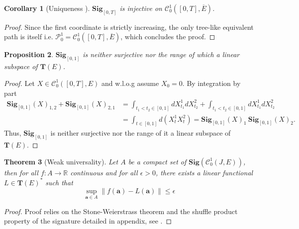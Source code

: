 \documentclass[12pt]{report}
\newtheorem{theorem}{Theorem}[chapter]
\newtheorem{corollary}[theorem]{Corollary}
\newtheorem{proposition}[theorem]{Proposition}
\theoremstyle{definition}
\theoremstyle{remark}
\newcommand{\R}{\mathbb{R}}
\begin{document}
\begin{corollary}[Uniqueness \cite{boedihardjo2016signature}] 
  $\mathbf{Sig}_{[0,T]}$ is injective on $\mathcal{C}^{1}_{0}([0,T],\overline{E})$.
\end{corollary}
\begin{proof}
  Since the first coordinate is strictly increasing, the only tree-like equivalent path is itself i.e. $\mathcal{P}^{1}_{0} = \mathcal{C}^{1}_{0}([0,T],\overline{E})$, which concludes the proof. 
\end{proof}
\begin{proposition}\label{surjective}
  $\mathbf{Sig}_{[0,1]}$ is neither surjective nor the range of which a linear subspace of $\mathbf{T}(E)$.
\end{proposition}
\begin{proof}
  Let $X \in \mathcal{C}^{1}_{0}([0,T],E)$ and w.l.o.g assume $X_{0} = 0$. 
  By integration by part
  \begin{equation}
    \begin{split}
      \mathbf{Sig}_{[0,1]}(X)_{1,2} + \mathbf{Sig}_{[0,1]}(X)_{2,1} &=  \int_{t_{1}<t_{2} \in [0,1]}dX_{t_{1}}^{1}dX_{t_{2}}^{2} + \int_{t_{1}<t_{2} \in [0,1]}dX_{t_{1}}^{1}dX_{t_{2}}^{2}\\
      &=  \int_{t \in [0,1]}d(X_{t}^{1}X_{t}^{2}) = \mathbf{Sig}_{[0,1]}(X)_{1}~\mathbf{Sig}_{[0,1]}(X)_{2}.
    \end{split}
  \end{equation}
  Thus, $\mathbf{Sig}_{[0,1]}$ is neither surjective nor the range of it a linear subspace of $\mathbf{T}(E)$.
\end{proof}

\begin{theorem}[Weak universality]
  Let $A$ be a compact set of $\mathbf{Sig}(\mathcal{C}^{1}_{0}(J,E))$, then for all $f \colon A \to \R$ continuous and for all $\epsilon > 0$, there exists a linear functional $L \in \mathbf{T}(E)^{*}$ such that 
  \begin{equation}
    \sup_{\mathbf{a}\in A}\lVert f(\mathbf{a}) - L(\mathbf{a})\rVert \leq \epsilon
  \end{equation}
\end{theorem}
\begin{proof}
  Proof relies on the Stone-Weierstrass theorem and the shuffle product property of the signature detailed in appendix, see \cite{liao2019learning}.
\end{proof}
\end{document}

